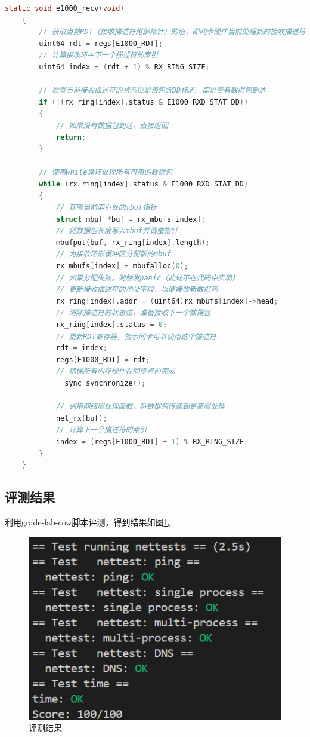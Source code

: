 \begin{lstlisting}[language=c,title=e1000\_recv函数的实现]
    static void e1000_recv(void)
    {
        // 获取当前RDT（接收描述符尾部指针）的值，即网卡硬件当前处理到的接收描述符索引
        uint64 rdt = regs[E1000_RDT];
        // 计算接收环中下一个描述符的索引
        uint64 index = (rdt + 1) % RX_RING_SIZE;

        // 检查当前接收描述符的状态位是否包含DD标志，即是否有数据包到达
        if (!(rx_ring[index].status & E1000_RXD_STAT_DD))
        {
            // 如果没有数据包到达，直接返回
            return;
        }

        // 使用while循环处理所有可用的数据包
        while (rx_ring[index].status & E1000_RXD_STAT_DD)
        {
            // 获取当前索引处的mbuf指针
            struct mbuf *buf = rx_mbufs[index];
            // 将数据包长度写入mbuf并调整指针
            mbufput(buf, rx_ring[index].length);
            // 为接收环形缓冲区分配新的mbuf
            rx_mbufs[index] = mbufalloc(0);
            // 如果分配失败，则触发panic（此处不在代码中实现）
            // 更新接收描述符的地址字段，以便接收新数据包
            rx_ring[index].addr = (uint64)rx_mbufs[index]->head;
            // 清除描述符的状态位，准备接收下一个数据包
            rx_ring[index].status = 0;
            // 更新RDT寄存器，指示网卡可以使用这个描述符
            rdt = index;
            regs[E1000_RDT] = rdt;
            // 确保所有内存操作在同步点前完成
            __sync_synchronize();

            // 调用网络层处理函数，将数据包传递到更高层处理
            net_rx(buf);
            // 计算下一个描述符的索引
            index = (regs[E1000_RDT] + 1) % RX_RING_SIZE;
        }
    }
\end{lstlisting}

\subsection{评测结果}
利用grade-lab-cow脚本评测，得到结果如图\ref{fig:net}。
\begin{figure}[h]
    \centering
    \includegraphics[width=\linewidth]{pics/net评测结果.png}
    \caption{评测结果}
    \label{fig:net}
\end{figure}

